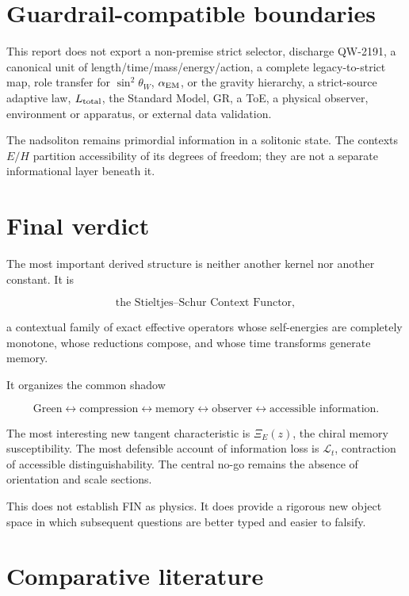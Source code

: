 \documentclass[11pt,a4paper,openany]{report}
\begin{document}
\chapter{Guardrail-compatible boundaries}

This report does not export a non-premise strict selector, discharge QW-2191, a canonical unit of length/\allowbreak{}time/\allowbreak{}mass/\allowbreak{}energy/\allowbreak{}action, a complete legacy-to-strict map, role transfer for \(\sin^2\theta_W\), \(\alpha_{\rm EM}\), or the gravity hierarchy, a strict-source adaptive law, \(L_{\rm total}\), the Standard Model, GR, a ToE, a physical observer, environment or apparatus, or external data validation.

The nadsoliton remains primordial information in a solitonic state. The contexts \(E/H\) partition accessibility of its degrees of freedom; they are not a separate informational layer beneath it.

\chapter{Final verdict}

The most important derived structure is neither another kernel nor another constant. It is

\[
\boxed{\text{the Stieltjes--Schur Context Functor}},
\]

a contextual family of exact effective operators whose self-energies are completely monotone, whose reductions compose, and whose time transforms generate memory.

It organizes the common shadow

\[
\text{Green}\leftrightarrow\text{compression}
\leftrightarrow\text{memory}\leftrightarrow\text{observer}
\leftrightarrow\text{accessible information}.
\]

The most interesting new tangent characteristic is \(\Xi_E(z)\), the chiral memory susceptibility. The most defensible account of information loss is \(\mathcal L_t\), contraction of accessible distinguishability. The central no-go remains the absence of orientation and scale sections.

This does not establish FIN as physics. It does provide a rigorous new object space in which subsequent questions are better typed and easier to falsify.

\chapter{Comparative literature}
\end{document}
